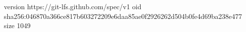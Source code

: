 version https://git-lfs.github.com/spec/v1
oid sha256:046870a366ce817b603272209e6daa85ae0f2926262d504b0fe4d69ba238e477
size 1049
